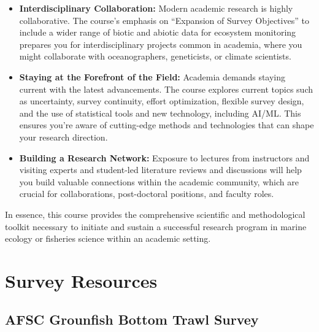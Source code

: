 \documentclass[
  letterpaper,
  oneside,
  open=any]{scrbook}
\begin{document}
\begin{itemize}
\item
  \textbf{Interdisciplinary Collaboration:} Modern academic research is
  highly collaborative. The course's emphasis on ``Expansion of Survey
  Objectives'' to include a wider range of biotic and abiotic data for
  ecosystem monitoring prepares you for interdisciplinary projects
  common in academia, where you might collaborate with oceanographers,
  geneticists, or climate scientists.
\item
  \textbf{Staying at the Forefront of the Field:} Academia demands
  staying current with the latest advancements. The course explores
  current topics such as uncertainty, survey continuity, effort
  optimization, flexible survey design, and the use of statistical tools
  and new technology, including AI/ML. This ensures you're aware of
  cutting-edge methods and technologies that can shape your research
  direction.
\item
  \textbf{Building a Research Network:} Exposure to lectures from
  instructors and visiting experts and student-led literature reviews
  and discussions will help you build valuable connections within the
  academic community, which are crucial for collaborations,
  post-doctoral positions, and faculty roles.
\end{itemize}

In essence, this course provides the comprehensive scientific and
methodological toolkit necessary to initiate and sustain a successful
research program in marine ecology or fisheries science within an
academic setting.


\chapter{Survey Resources}\label{survey-resources}

\section{AFSC Grounfish Bottom Trawl
Survey}\label{afsc-grounfish-bottom-trawl-survey}
\end{document}
